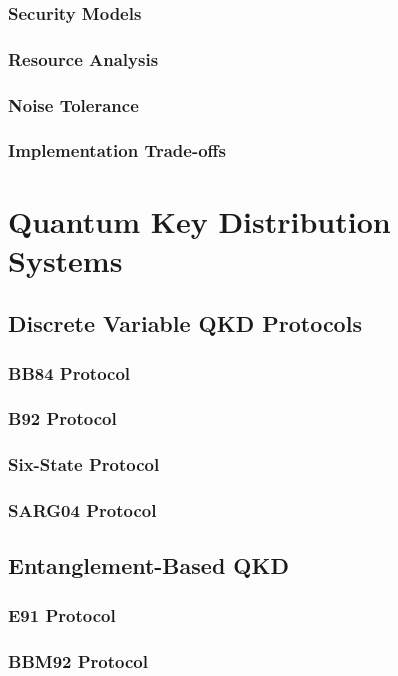\documentclass[12pt,a4paper]{book}
\begin{document}
\subsection{Security Models}
\subsection{Resource Analysis}
\subsection{Noise Tolerance}
\subsection{Implementation Trade-offs}

\chapter{Quantum Key Distribution Systems}

\section{Discrete Variable QKD Protocols}
\subsection{BB84 Protocol}
\subsection{B92 Protocol}
\subsection{Six-State Protocol}
\subsection{SARG04 Protocol}

\section{Entanglement-Based QKD}
\subsection{E91 Protocol}
\subsection{BBM92 Protocol}
\end{document}
